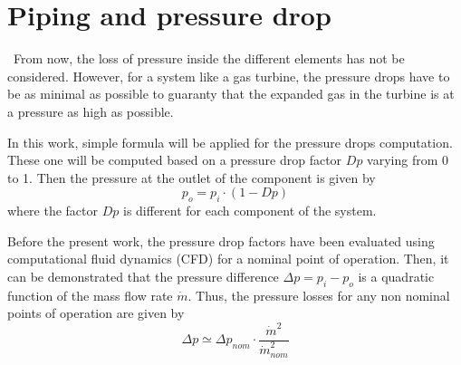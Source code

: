 \section{Piping and pressure drop}
\quad\, From now, the loss of pressure inside the different elements has not be considered. However, for a system like a gas turbine, the pressure drops have to be as minimal as possible to guaranty that the expanded gas in the turbine is at a pressure as high as possible. 

In this work, simple formula will be applied for the pressure drops computation. These one will be computed based on a pressure drop factor $Dp$ varying from 0 to 1. Then the pressure at the outlet of the component is given by
\begin{equation}
p_{o} = p_{i}\cdot (1 - Dp)
\end{equation}
where the factor $Dp$ is different for each component of the system. 

Before the present work, the pressure drop factors have been evaluated using computational fluid dynamics (CFD) for a nominal point of operation. Then, it can be demonstrated that the pressure difference $\Delta p = p_{i} - p_{o}$ is a quadratic function of the mass flow rate $\dot{m}$. Thus, the pressure losses for any non nominal points of operation are given by
\begin{equation}
\Delta p \simeq \Delta p_{nom}\cdot \frac{\dot{m}^2}{\dot{m}^2_{nom}}
\end{equation}
